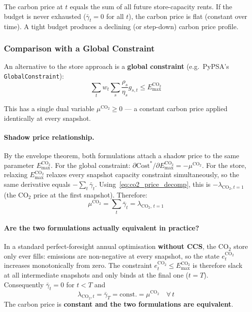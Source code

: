 \documentclass{article}
\begin{document}
The carbon price at $t$ equals the sum of all future store-capacity rents.
If the budget is never exhausted ($\bar{\gamma}_t = 0$ for all $t$), the
carbon price is flat (constant over time). A tight budget produces a
declining (or step-down) carbon price profile.

\subsubsection{Comparison with a Global Constraint}

An alternative to the store approach is a \textbf{global constraint}
(e.g.\ PyPSA's \texttt{GlobalConstraint}):
\begin{equation}
    \sum_t w_t \sum_s \frac{\rho_s}{\eta_s} g_{s,t} \le E^{\text{CO}_2}_{\max}
    \label{eq:global_co2}
\end{equation}

This has a single dual variable $\mu^{\text{CO}_2} \ge 0$ --- a constant carbon
price applied identically at every snapshot.

\paragraph{Shadow price relationship.}
By the envelope theorem, both formulations attach a shadow price to the same
parameter $E^{\text{CO}_2}_{\max}$. For the global constraint:
$\partial \text{Cost}^*/\partial E^{\text{CO}_2}_{\max} = -\mu^{\text{CO}_2}$.
For the store, relaxing $E^{\text{CO}_2}_{\max}$ relaxes every snapshot capacity
constraint simultaneously, so the same derivative equals $-\sum_t \bar{\gamma}_t$.
Using~\eqref{eq:co2_price_decomp}, this is $-\lambda_{\text{CO}_2,t=1}$
(the CO$_2$ price at the first snapshot).
Therefore:
\begin{equation}
    \mu^{\text{CO}_2} = \sum_t \bar{\gamma}_t = \lambda_{\text{CO}_2,\,t=1}
    \label{eq:co2_shadow_relation}
\end{equation}

\paragraph{Are the two formulations actually equivalent in practice?}
In a standard perfect-foresight annual optimisation \textbf{without CCS},
the CO$_2$ store only ever fills: emissions are non-negative at every snapshot,
so the state $e^{\text{CO}_2}_t$ increases monotonically from zero.
The constraint $e^{\text{CO}_2}_t \le E^{\text{CO}_2}_{\max}$ is therefore
slack at all intermediate snapshots and only binds at the final one ($t = T$).
Consequently $\bar{\gamma}_t = 0$ for $t < T$ and
\begin{equation}
    \lambda_{\text{CO}_2,t} = \bar{\gamma}_T = \text{const.} = \mu^{\text{CO}_2}
    \quad \forall\, t
\end{equation}
The carbon price is \textbf{constant and the two formulations are equivalent}.
\end{document}
